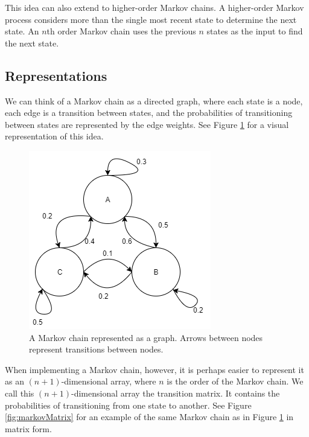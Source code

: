 This idea can also extend to higher-order Markov chains.
A higher-order Markov process considers more than the single most recent state to determine the next state.
An $n$th order Markov chain uses the previous $n$ states as the input to find the next state.

\subsection{Representations} \label{bg:markov:representations}

We can think of a Markov chain as a directed graph, where each state is a node, each edge is a transition between states, and the probabilities of transitioning between states are represented by the edge weights.
See Figure \ref{fig:markovGraph} for a visual representation of this idea.

\begin{figure}[h]
	\centering
	\includegraphics[width=\linewidth]{figures/markovGraph.png} %
	\caption[A Markov chain represented as a graph.]{A Markov chain represented as a graph. Arrows between nodes represent transitions between nodes.}
	\label{fig:markovGraph}
\end{figure}

When implementing a Markov chain, however, it is perhaps easier to represent it as an $(n + 1)$-dimensional array, where $n$ is the order of the Markov chain.
We call this $(n + 1)$-dimensional array the transition matrix.
It contains the probabilities of transitioning from one state to another.
See Figure \ref{fig:markovMatrix} for an example of the same Markov chain as in Figure \ref{fig:markovGraph} in matrix form.

